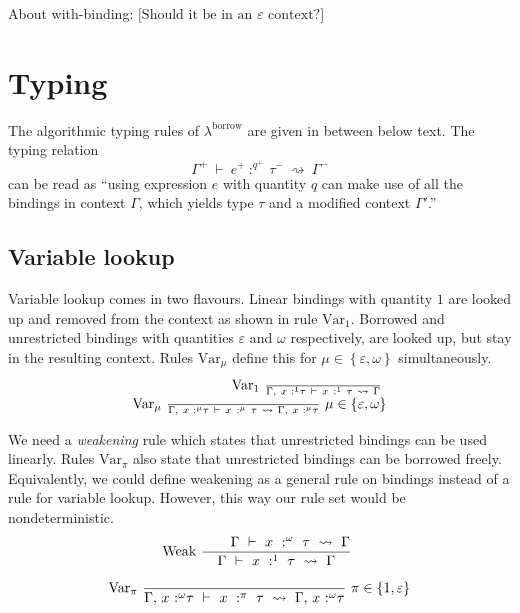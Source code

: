 About with-binding:
\(\lbrack\text{Should it be in an }\varepsilon\text{ context?}\rbrack\)

\section{Typing}

The algorithmic typing rules of \(\lambda^{\text{borrow}}\) are given in
between below text. The typing relation
\[\Gamma^{+}\  \vdash \ e^{+}\ :^{q^{+}}\ \tau^{-}\  \rightsquigarrow \ \Gamma^{-}\]
can be read as ``using expression \(e\) with quantity \(q\) can make use
of all the bindings in context \(\Gamma\), which yields type \(\tau\)
and a modified context \(\Gamma'\).''

\subsection{Variable lookup}

Variable lookup comes in two flavours. Linear bindings with quantity
\(1\) are looked up and removed from the context as shown in rule
\(\text{Var}_{1}\). Borrowed and unrestricted bindings with quantities
\(\varepsilon\) and \(\omega\) respectively, are looked up, but stay in
the resulting context. Rules \(\text{Var}_{\mu}\) define this for
\(\mu \in \left\{ \varepsilon,\omega \right\}\) simultaneously.
\[\begin{array}{r}
{\text{Var}_{1}\ \frac{\text{\quad\quad}\ }{\Gamma{,\ }{x\text{ :}^{1}\tau}\  \vdash \ x\ :^{1}\ \tau\  \rightsquigarrow \ \Gamma}\ } \\
{\text{Var}_{\mu}\ \frac{\text{\quad\quad}\ }{\Gamma{,\ }{x\text{ :}^{\mu}\tau}\  \vdash \ x\ :^{\mu}\ \tau\  \rightsquigarrow \ \Gamma{,\ }{x\text{ :}^{\mu}\tau}}\ \mu \in \left\{ \varepsilon,\omega \right\}}
\end{array}\]

We need a \emph{weakening} rule which states that unrestricted bindings
can be used linearly. Rules \(\text{Var}_{\pi}\) also state that
unrestricted bindings can be borrowed freely. Equivalently, we could
define weakening as a general rule on bindings instead of a rule for
variable lookup. However, this way our rule set would be
nondeterministic.
\[\text{Weak}\ \frac{\text{\quad\quad}{\Gamma\  \vdash \ x\ :^{\omega}\ \tau\  \rightsquigarrow \ \Gamma}}{\Gamma\  \vdash \ x\ :^{1}\ \tau\  \rightsquigarrow \ \Gamma}\ \]

\[\text{Var}_{\pi}\ \frac{\text{\quad\quad}\ }{\Gamma{,\ }{x\text{ :}^{\omega}\tau}\  \vdash \ x\ :^{\pi}\ \tau\  \rightsquigarrow \ \Gamma{,\ }{x\text{ :}^{\omega}\tau}}\ \pi \in \left\{ 1,\varepsilon \right\}\]

